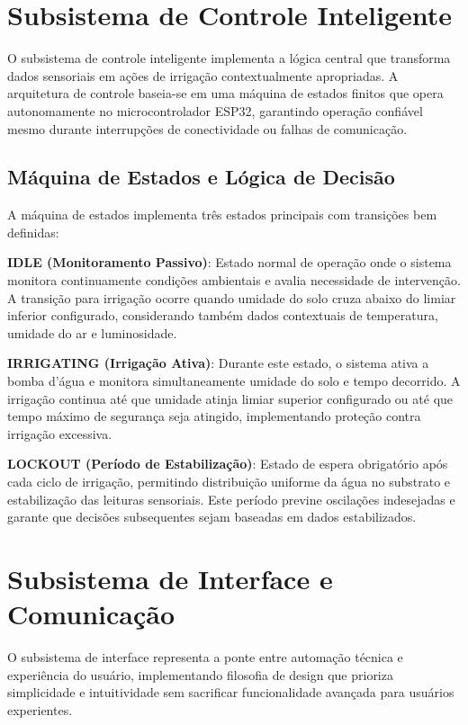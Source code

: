 \section{Subsistema de Controle Inteligente}

O subsistema de controle inteligente implementa a lógica central que transforma dados sensoriais em ações de irrigação contextualmente apropriadas. A arquitetura de controle baseia-se em uma máquina de estados finitos que opera autonomamente no microcontrolador ESP32, garantindo operação confiável mesmo durante interrupções de conectividade ou falhas de comunicação.

\subsection{Máquina de Estados e Lógica de Decisão}

A máquina de estados implementa três estados principais com transições bem definidas:

\textbf{IDLE (Monitoramento Passivo)}: Estado normal de operação onde o sistema monitora continuamente condições ambientais e avalia necessidade de intervenção. A transição para irrigação ocorre quando umidade do solo cruza abaixo do limiar inferior configurado, considerando também dados contextuais de temperatura, umidade do ar e luminosidade.

\textbf{IRRIGATING (Irrigação Ativa)}: Durante este estado, o sistema ativa a bomba d'água e monitora simultaneamente umidade do solo e tempo decorrido. A irrigação continua até que umidade atinja limiar superior configurado ou até que tempo máximo de segurança seja atingido, implementando proteção contra irrigação excessiva.

\textbf{LOCKOUT (Período de Estabilização)}: Estado de espera obrigatório após cada ciclo de irrigação, permitindo distribuição uniforme da água no substrato e estabilização das leituras sensoriais. Este período previne oscilações indesejadas e garante que decisões subsequentes sejam baseadas em dados estabilizados.

\section{Subsistema de Interface e Comunicação}

O subsistema de interface representa a ponte entre automação técnica e experiência do usuário, implementando filosofia de design que prioriza simplicidade e intuitividade sem sacrificar funcionalidade avançada para usuários experientes.

